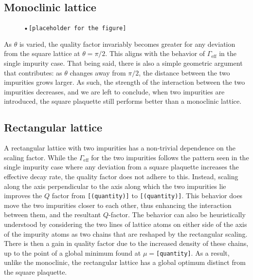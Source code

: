 \documentclass[aps,pra,superscriptaddress,twocolumn]{revtex4-1}
\newcommand{\commentSB}[1]{\texttt{\color{blue}[#1]}}
\begin{document}
\subsection{Monoclinic lattice}

\begin{figure}
    \centering
    \caption{•\commentSB{placeholder for the figure}}
    \label{fig:mono_rect_thetadelta}
\end{figure}

As $\theta$ is varied, the quality factor invariably becomes greater for any deviation from the square lattice at $\theta = \pi/2$. This aligns with the behavior of $\Gamma_\text{eff}$ in the single impurity case. That being said, there is also a simple geometric argument that contributes: as $\theta$ changes away from $\pi/2$, the distance between the two impurities grows larger. As such, the strength of the interaction between the two impurities decreases, and we are left to conclude, when two impurities are introduced, the square plaquette still performs better than a monoclinic lattice. 

\subsection{Rectangular lattice}

A rectangular lattice with two impurities has a non-trivial dependence on the scaling factor. While the $\Gamma_\text{eff}$ for the two impurities follows the pattern seen in the single impurity case where any deviation from a square plaquette increases the effective decay rate, the quality factor does not adhere to this. Instead, scaling along the axis perpendicular to the axis along which the two impurities lie improves the $Q$ factor from \commentSB{(quantity)} to \commentSB{(quantity)}. This behavior does move the two impurities closer to each other, thus enhancing the interaction between them, and the resultant $Q$-factor. The behavior can also be heuristically understood by considering the two lines of lattice atoms on either side of the axis of the impurity atoms as two chains that are reshaped by the rectangular scaling. There is then a gain in quality factor due to the increased density of these chains, up to the point of a global minimum found at $\mu=$\commentSB{quantity}. As a result, unlike the monoclinic, the rectangular lattice has a global optimum distinct from the square plaquette. 
\end{document}
